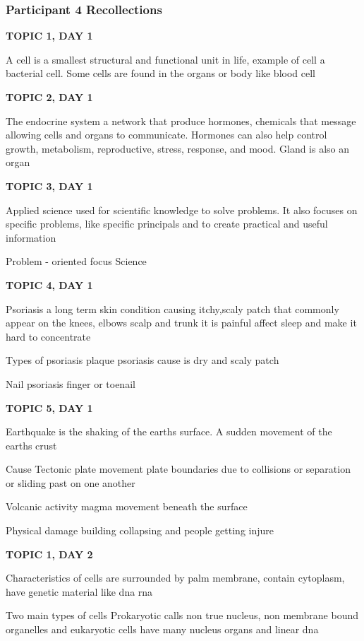 {{{\subsubsection{Participant 4 Recollections}

{\footnotesize
\textbf{TOPIC 1, DAY 1}

A cell is a smallest structural and functional unit in life, example of cell a bacterial cell. Some cells are found in the organs or body like blood cell

\textbf{TOPIC 2, DAY 1}

The endocrine system a network that produce hormones, chemicals that message allowing cells and organs to communicate. Hormones can also help control growth, metabolism, reproductive, stress, response, and mood. Gland is also an organ 

\textbf{TOPIC 3, DAY 1}

Applied science used for scientific knowledge to solve problems. It also focuses on specific problems, like specific principals and to create practical and useful information 

Problem - oriented focus Science 

\textbf{TOPIC 4, DAY 1}

Psoriasis a long term skin condition causing itchy,scaly patch that commonly appear on the knees, elbows scalp and trunk it is painful affect sleep and make it hard to concentrate 


Types of psoriasis plaque psoriasis cause is dry and scaly patch 


Nail psoriasis finger or toenail 

\textbf{TOPIC 5, DAY 1}

Earthquake is the shaking of the earths surface. A sudden movement of the earths crust 


Cause 
Tectonic plate movement plate boundaries due to collisions or separation or sliding past on one another 


Volcanic activity magma movement beneath the surface 


Physical damage building collapsing and people getting injure

\textbf{TOPIC 1, DAY 2}

Characteristics of cells are surrounded by palm membrane, contain cytoplasm, have genetic material like dna rna


Two main types of cells
Prokaryotic calls non true nucleus, non membrane bound organelles and eukaryotic cells have many nucleus organs and linear dna 

}}}}
